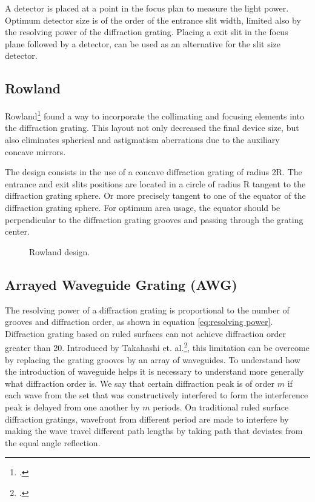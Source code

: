 \documentclass[12pt,twoside,english]{book}
\renewcommand{\~}{\perispomeni}%
\numberwithin{equation}{section}
\numberwithin{figure}{section}
\begin{document}
A detector is placed at a point in the focus plan to measure the light power. Optimum detector size is of the order of the entrance slit width, limited also by the resolving power of the diffraction grating. Placing a exit slit in the focus plane followed by a detector, can be used as an alternative for the slit size detector. 

\subsection{Rowland\label{sub:Rowland}}

Rowland\footcite{Rowland:1883p38} found a way to incorporate the collimating and focusing elements into the diffraction grating. This layout not only decreased the final device size, but also eliminates spherical and astigmatism aberrations due to the auxiliary concave mirrors.

The design consists in the use of a concave diffraction grating of radius 2R. The entrance and exit slits positions are located in a circle of radius R tangent to the diffraction grating sphere. Or more precisely tangent to one of the equator of the diffraction grating sphere. For optimum area usage, the equator should be perpendicular to the diffraction grating grooves and passing through the grating center.

%
\begin{figure}[h]
\center{}
\caption{Rowland design.}
\end{figure}



\subsection{Arrayed Waveguide Grating (AWG)}

The resolving power of a diffraction grating is proportional to the number of grooves and diffraction order, as shown in equation \ref{eq:resolving power}. Diffraction grating based on ruled surfaces can not achieve diffraction order greater than 20. Introduced by Takahashi et. al.\footcite{Takahashi:1990p122}, this limitation can be overcome by replacing the grating grooves by an array of waveguides. To understand how the introduction of waveguide helps it is necessary to understand more generally what diffraction order is. We say that certain diffraction peak is of order $m$ if each wave from the set that was constructively interfered to form the interference peak is delayed from one another by $m$ periods. On traditional ruled surface diffraction gratings, wavefront from different period are made to interfere by making the wave travel different path lengths by taking path that deviates from the equal angle reflection.
\end{document}

